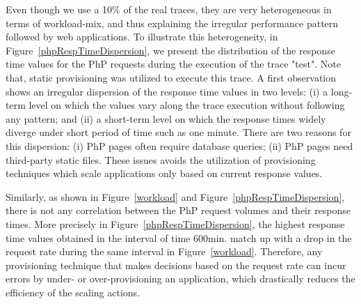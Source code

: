 Even though we use a 10\% of the real traces, they are very heterogeneous in terms of workload-mix, and thus explaining the irregular performance pattern followed by web applications. To illustrate this heterogeneity, in Figure~\ref{phpRespTimeDispersion}, we present the distribution of the response time values for the PhP requests during the execution of the trace "test". Note that, static provisioning was utilized to execute this trace. A first observation shows an irregular dispersion of the response time values in two levels: (i) a long-term level on which the values vary along the trace execution without following any pattern; and (ii) a short-term level on which the response times widely diverge under short period of time such as one minute. There are two reasons for this dispersion: (i) PhP pages often require database queries; (ii) PhP pages need third-party static files. These issues avoids the utilization of provisioning techniques which scale applications only based on current response values. 

Similarly, as shown in Figure~\ref{workload} and Figure~\ref{phpRespTimeDispersion}, there is not any correlation between the PhP request volumes and their response times. More precisely in Figure~\ref{phpRespTimeDispersion}, the highest response time values obtained in the interval of time 600min. match up with a drop in the request rate during the same interval in Figure~\ref{workload}. Therefore, any provisioning technique that makes decisions based on the request rate can incur errors by under- or over-provisioning an application, which drastically reduces the efficiency of the scaling actions. 






